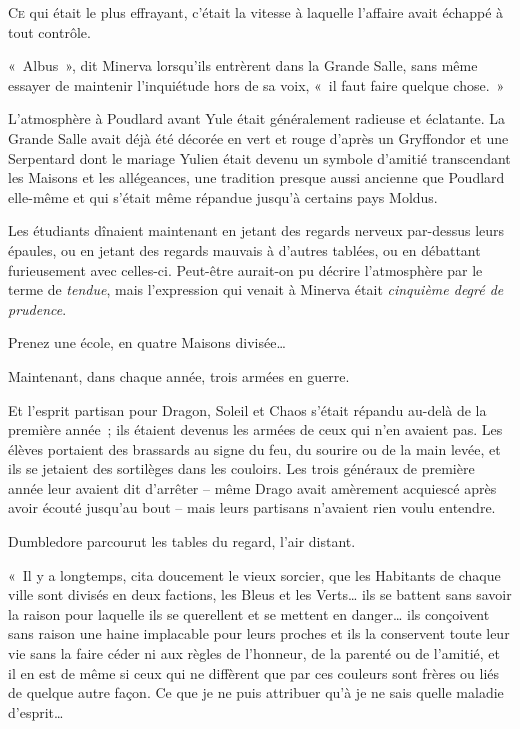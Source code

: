 

\lettrine{C}{e} qui était le plus effrayant, c'était la vitesse à laquelle l'affaire avait échappé à tout contrôle.

«~Albus~», dit Minerva lorsqu'ils entrèrent dans la Grande Salle, sans même essayer de maintenir l'inquiétude hors de sa voix, «~il faut faire quelque chose.~»

L'atmosphère à Poudlard avant Yule était généralement radieuse et éclatante. La Grande Salle avait déjà été décorée en vert et rouge d'après un Gryffondor et une Serpentard dont le mariage Yulien était devenu un symbole d'amitié transcendant les Maisons et les allégeances, une tradition presque aussi ancienne que Poudlard elle-même et qui s'était même répandue jusqu'à certains pays Moldus.

Les étudiants dînaient maintenant en jetant des regards nerveux par-dessus leurs épaules, ou en jetant des regards mauvais à d'autres tablées, ou en débattant furieusement avec celles-ci. Peut-être aurait-on pu décrire l'atmosphère par le terme de \emph{tendue}, mais l'expression qui venait à Minerva était \emph{cinquième degré de prudence}.

Prenez une école, en quatre Maisons divisée…

Maintenant, dans chaque année, trois armées en guerre.

Et l'esprit partisan pour Dragon, Soleil et Chaos s'était répandu au-delà de la première année~; ils étaient devenus les armées de ceux qui n'en avaient pas. Les élèves portaient des brassards au signe du feu, du sourire ou de la main levée, et ils se jetaient des sortilèges dans les couloirs. Les trois généraux de première année leur avaient dit d'arrêter -- même Drago avait amèrement acquiescé après avoir écouté jusqu'au bout -- mais leurs partisans n'avaient rien voulu entendre.

Dumbledore parcourut les tables du regard, l'air distant.

«~Il y a longtemps, cita doucement le vieux sorcier, que les Habitants de chaque ville sont divisés en deux factions, les Bleus et les Verts… ils se battent sans savoir la raison pour laquelle ils se querellent et se mettent en danger… ils conçoivent sans raison une haine implacable pour leurs proches et ils la conservent toute leur vie sans la faire céder ni aux règles de l'honneur, de la parenté ou de l'amitié, et il en est de même si ceux qui ne diffèrent que par ces couleurs sont frères ou liés de quelque autre façon. Ce que je ne puis attribuer qu'à je ne sais quelle maladie d'esprit…

